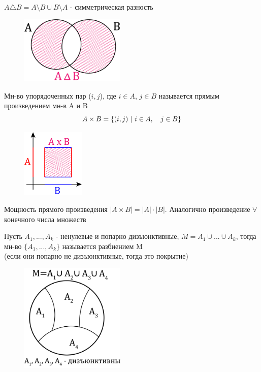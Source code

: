 \documentclass[discrete.tex]{subfiles}
\begin{document}
\begin{definition}
  $A \triangle B = A \setminus B \cup B \setminus A$ - симметрическая разность
  \begin{figure}[H]
      \includegraphics[width=5cm]{pics/1_6.png}
      \centering
  \end{figure}
\end{definition}

\begin{definition}
  Мн-во упорядоченных пар ($i,j$), где $i \in A$, $j \in B$ называется прямым произведением мн-в A и B
  \[A \times B = \{(i,j)\ |\ i \in A,\quad j \in B\}\]
  \begin{figure}[H]
      \includegraphics[width=3cm]{pics/1_7.png}
      \centering
  \end{figure}
\end{definition}

\begin{remark}
  Мощность прямого произведения $|A \times B| = |A| \cdot |B|$. Аналогично произведение $\forall$ конечного числа множеств
\end{remark}

\begin{definition}
  Пусть $A_1,...,A_k$ - ненулевые и попарно дизъюнктивные, $M = A_1 \cup ... \cup A_k$, тогда мн-во $\{A_1,...,A_k\}$ называется разбиением M\\
  (если они попарно не дизъюнктивные, тогда это покрытие)
  \begin{figure}[H]
      \includegraphics[width=5cm]{pics/1_8.png}
      \centering
  \end{figure}
\end{definition}
\end{document}
